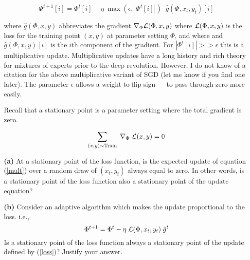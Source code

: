 \documentclass{article}
\newcommand{\solution}[1]{}
\begin{document}
\begin{equation}
  \Phi^{t+1}[i] = \Phi^t[i] - \eta \;\max(\epsilon,|\Phi^t[i]|)\;\;\hat{g}(\Phi,x_t,y_t)[i]
  \label{mult}
\end{equation}

where $\hat{g}(\Phi,x,y)$ abbreviates the gradient $\nabla_\Phi{\cal L}(\Phi,x,y)$ where ${\cal L}(\Phi,x,y)$ is the loss for the training point $(x,y)$ at parameter setting $\Phi$, and where
and $\hat{g}(\Phi,x,y)[i]$ is the $i$th component of the gradient.  For $|\Phi^t[i]| >> \epsilon$ this is a multiplicative update.
Multiplicative updates have a long history and rich theory for mixtures of experts prior to the deep revolution.  However, I do not know of a citation for
the above multiplicative variant of SGD (let me know if you find one later).  The parameter $\epsilon$ allows a weight to flip sign --- to pass through zero more easily.

Recall that a stationary point is a parameter setting where the total gradient is zero.

\begin{equation}
  \sum_{(x,y) \sim \mathrm{Train}}\; \nabla_\Phi\;{\cal L}(x,y) = 0
  \label{stationary}
\end{equation}

\medskip
    {\bf (a)} At a stationary point of the loss function, is the expected update of equation (\ref{mult}) over a random draw of $(x_t,y_t)$ always equal to zero.  In other words, is a stationary point of the loss function
    also a stationary point of the update equation?

\solution{Yes, a stationary point of the loss function is also a stationary point of the update equation.
  \begin{eqnarray*}
    & & E_{(x,y) \sim \train} \;\;\eta\;\max(\epsilon,|\Phi^t[i]|)\;\left(\nabla_\Phi \;{\cal L}(\Phi,x,y)\right)[i]  \\
    \\
    & = & \eta\;\max(\epsilon,|\Phi[i]|)\;E_{(x,y)\sim\train} \left(\nabla_\Phi {\cal L}(\Phi,x,y)\right)[i] \\
    \\
    & = & 0
  \end{eqnarray*}
  }

\medskip
{\bf (b)} Consider an adaptive algorithm which makes the update proportional to the loss. i.e.,
\begin{equation}
  \Phi^{t+1}= \Phi^t - \eta\;{\cal L}(\Phi,x_t,y_t)\;\hat{g}^t
  \label{loss}
\end{equation}
Is a stationary point of the loss function always a stationary point of the update defined by (\ref{loss})?  Justify your answer.
\end{document}
